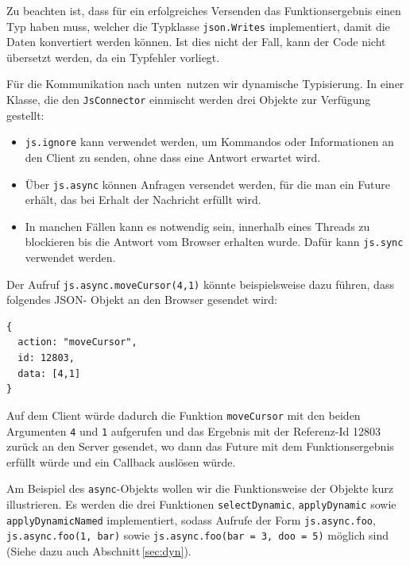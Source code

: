Zu beachten ist, dass für ein erfolgreiches Versenden das Funktionsergebnis einen Typ haben muss,
welcher die Typklasse \texttt{json.Writes} implementiert, damit die Daten konvertiert werden können.
Ist dies nicht der Fall, kann der Code nicht übersetzt werden, da ein Typfehler vorliegt.

Für die Kommunikation nach \glqq unten\grqq\ nutzen wir dynamische Typisierung. In einer Klasse, die
den \texttt{JsConnector} einmischt werden drei Objekte zur Verfügung gestellt:

\begin{itemize}
  \item \texttt{js.ignore} kann verwendet werden, um Kommandos oder Informationen an den Client zu 
  senden, ohne dass eine Antwort erwartet wird.
  \item Über \texttt{js.async} können Anfragen versendet werden, für die man ein Future erhält, 
  das bei Erhalt der Nachricht erfüllt wird.
  \item In manchen Fällen kann es notwendig sein, innerhalb eines Threads zu blockieren bis die 
  Antwort vom Browser erhalten wurde. Dafür kann \texttt{js.sync} verwendet werden.
\end{itemize}

Der Aufruf \texttt{js.async.moveCursor(4,1)} könnte beispielsweise dazu führen, dass folgendes JSON-
Objekt an den Browser gesendet wird:

\begin{lstlisting}
{
  action: "moveCursor",
  id: 12803,
  data: [4,1]
}
\end{lstlisting}

Auf dem Client würde dadurch die Funktion \texttt{moveCursor} mit den beiden Argumenten \texttt{4}
und \texttt{1} aufgerufen und das Ergebnis mit der Referenz-Id 12803 zurück an den Server gesendet,
wo dann das Future mit dem Funktionsergebnis erfüllt würde und ein Callback auslösen würde.

Am Beispiel des \texttt{async}-Objekts wollen wir die Funktionsweise der Objekte kurz illustrieren.
Es werden die drei Funktionen \texttt{selectDynamic}, \texttt{applyDynamic} sowie
\texttt{applyDynamicNamed} implementiert, sodass Aufrufe der Form \texttt{js.async.foo},
\texttt{js.async.foo(1, bar)} sowie \texttt{js.async.foo(bar = 3, doo = 5)} möglich sind (Siehe dazu
auch Abschnitt\,\ref{sec:dyn}).

